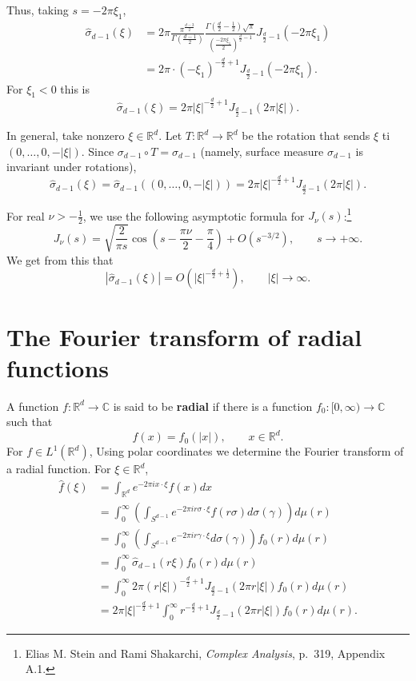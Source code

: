 \documentclass{article}
\begin{document}
Thus, taking $s=-2\pi \xi_1$,
\begin{align*}
\widehat{\sigma}_{d-1}(\xi) &= 2\pi \frac{\pi^{\frac{d-3}{2}}}{\Gamma\left(\frac{d-1}{2}\right)} 
\frac{\Gamma\left(\frac{d}{2}-\frac{1}{2} \right) \sqrt{\pi}}{\left(\frac{-2\pi \xi_1}{2}\right)^{\frac{d}{2}-1}} J_{\frac{d}{2}-1}(-2\pi \xi_1)\\
&=2\pi \cdot (-\xi_1)^{-\frac{d}{2}+1}J_{\frac{d}{2}-1}(-2\pi \xi_1).
\end{align*}
For $\xi_1<0$ this is
\[
\widehat{\sigma}_{d-1}(\xi) = 2\pi |\xi|^{-\frac{d}{2}+1} 
J_{\frac{d}{2}-1}(2\pi |\xi|).
\]

In general, take nonzero $\xi \in \mathbb{R}^d$. Let
$T:\mathbb{R}^d \to \mathbb{R}^d$ be the rotation that sends $\xi$ ti $(0,\ldots,0,-|\xi|)$.
Since $\sigma_{d-1} \circ T = \sigma_{d-1}$ (namely,
surface measure $\sigma_{d-1}$ is invariant under rotations),
\[
\widehat{\sigma}_{d-1}(\xi) = \widehat{\sigma}_{d-1}((0,\ldots,0,-|\xi|))=2\pi |\xi|^{-\frac{d}{2}+1} 
J_{\frac{d}{2}-1}(2\pi |\xi|).
\]

For real $\nu>-\frac{1}{2}$, we use the following asymptotic formula for $J_\nu(s)$:\footnote{Elias M. Stein and Rami Shakarchi,
{\em Complex Analysis}, p.~319, Appendix A.1.}
\[
J_\nu(s) = \sqrt{\frac{2}{\pi s}} \cos\left(s-\frac{\pi \nu}{2}-\frac{\pi}{4}\right) + O(s^{-3/2}), \qquad s \to +\infty.
\]
We get from this that
\[
|\widehat{\sigma}_{d-1}(\xi)| = O(|\xi|^{-\frac{d}{2}+\frac{1}{2}}), \qquad |\xi| \to \infty.
\]


\section{The Fourier transform of radial functions}
A function $f:\mathbb{R}^d \to \mathbb{C}$ is said to be \textbf{radial} if there is a function
$f_0:[0,\infty) \to \mathbb{C}$ such that
\[
f(x) = f_0(|x|), \qquad x \in \mathbb{R}^d.
\]
For $f \in L^1(\mathbb{R}^d)$,
Using polar coordinates we determine the Fourier transform of a radial function. For $\xi \in \mathbb{R}^d$,
\begin{align*}
\widehat{f}(\xi)&=\int_{\mathbb{R}^d} e^{-2\pi ix\cdot \xi} f(x) dx\\
&=\int_0^\infty \left( \int_{S^{d-1}} e^{-2\pi ir\sigma \cdot \xi} f(r\sigma) d\sigma(\gamma) \right) d\mu(r)\\
&=\int_0^\infty \left( \int_{S^{d-1}} e^{-2\pi ir\gamma \cdot \xi} d\sigma(\gamma) \right)  f_0(r) d\mu(r)\\
&=\int_0^\infty \widehat{\sigma}_{d-1}(r\xi) f_0(r) d\mu(r)\\
&=\int_0^\infty 2\pi (r|\xi|)^{-\frac{d}{2}+1} J_{\frac{d}{2}-1}(2\pi r|\xi|) f_0(r) d\mu(r)\\
&=2\pi |\xi|^{-\frac{d}{2}+1} \int_0^\infty r^{-\frac{d}{2}+1}J_{\frac{d}{2}-1}(2\pi r|\xi|) f_0(r) d\mu(r).
\end{align*}
\end{document}
